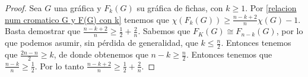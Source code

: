    \begin{proof}
        Sea $G$ una gr\'afica y $F_k(G)$ su gr\'afica de fichas, con $k \geq 1$. Por
        \cref{relacion num cromatico G y F(G) con k} tenemos que $\chi(F_k(G)) \geq
        \frac{n-k+2}{n} \chi(G) -1$. Basta demostrar que $\frac{n-k+2}{n} \geq
        \frac{1}{2}+\frac{2}{n}$. Sabemos que $F_K(G) \cong F_{n-k}(G)$, por lo que
        podemos asumir, sin p\'erdida de generalidad, que $k\leq \frac{n}{2}$.
        Entonces tenemos que $\frac{2n-n}{2}\geq k$, de donde obtenemos que $n-k
        \geq \frac{n}{2}$. Entonces tenemos que $\frac{n-k}{n}\geq \frac{1}{2}$. Por
        lo tanto $\frac{n-k+2}{n} \geq \frac{1}{2}+\frac{2}{n}$.
    \end{proof}